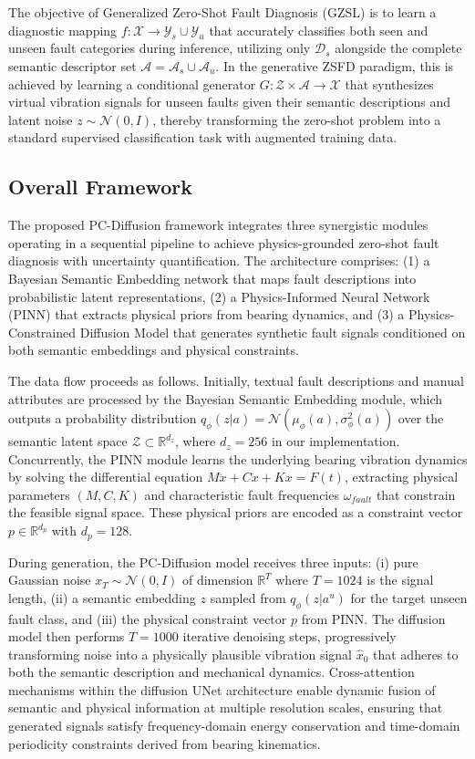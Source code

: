 \documentclass[journal]{IEEEtran}
\begin{document}
The objective of Generalized Zero-Shot Fault Diagnosis (GZSL) is to learn a diagnostic mapping $f: \mathcal{X} \rightarrow \mathcal{Y}_s \cup \mathcal{Y}_u$ that accurately classifies both seen and unseen fault categories during inference, utilizing only $\mathcal{D}_s$ alongside the complete semantic descriptor set $\mathcal{A} = \mathcal{A}_s \cup \mathcal{A}_u$. In the generative ZSFD paradigm, this is achieved by learning a conditional generator $G: \mathcal{Z} \times \mathcal{A} \rightarrow \mathcal{X}$ that synthesizes virtual vibration signals for unseen faults given their semantic descriptions and latent noise $z \sim \mathcal{N}(0, I)$, thereby transforming the zero-shot problem into a standard supervised classification task with augmented training data.

\subsection{Overall Framework}
The proposed PC-Diffusion framework integrates three synergistic modules operating in a sequential pipeline to achieve physics-grounded zero-shot fault diagnosis with uncertainty quantification. The architecture comprises: (1) a Bayesian Semantic Embedding network that maps fault descriptions into probabilistic latent representations, (2) a Physics-Informed Neural Network (PINN) that extracts physical priors from bearing dynamics, and (3) a Physics-Constrained Diffusion Model that generates synthetic fault signals conditioned on both semantic embeddings and physical constraints.

The data flow proceeds as follows. Initially, textual fault descriptions and manual attributes are processed by the Bayesian Semantic Embedding module, which outputs a probability distribution $q_\phi(z|a) = \mathcal{N}(\mu_\phi(a), \sigma_\phi^2(a))$ over the semantic latent space $\mathcal{Z} \subset \mathbb{R}^{d_z}$, where $d_z=256$ in our implementation. Concurrently, the PINN module learns the underlying bearing vibration dynamics by solving the differential equation $M\ddot{x} + C\dot{x} + Kx = F(t)$, extracting physical parameters $(M, C, K)$ and characteristic fault frequencies $\omega_{fault}$ that constrain the feasible signal space. These physical priors are encoded as a constraint vector $p \in \mathbb{R}^{d_p}$ with $d_p=128$.

During generation, the PC-Diffusion model receives three inputs: (i) pure Gaussian noise $x_T \sim \mathcal{N}(0, I)$ of dimension $\mathbb{R}^T$ where $T=1024$ is the signal length, (ii) a semantic embedding $z$ sampled from $q_\phi(z|a^u)$ for the target unseen fault class, and (iii) the physical constraint vector $p$ from PINN. The diffusion model then performs $T=1000$ iterative denoising steps, progressively transforming noise into a physically plausible vibration signal $\hat{x}_0$ that adheres to both the semantic description and mechanical dynamics. Cross-attention mechanisms within the diffusion UNet architecture enable dynamic fusion of semantic and physical information at multiple resolution scales, ensuring that generated signals satisfy frequency-domain energy conservation and time-domain periodicity constraints derived from bearing kinematics.
\end{document}
